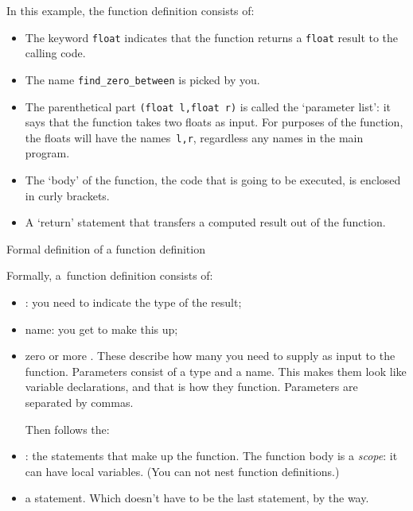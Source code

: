 In this example, the function definition consists of:
\begin{itemize}
\item The  keyword \lstinline{float} indicates that the function 
  returns a \lstinline{float} result to the calling code.
\item The name \lstinline{find_zero_between} is picked by you.
\item The parenthetical part \lstinline{(float l,float r)} is called the `parameter list':
  it says that the function takes two floats as input.
  For purposes of the function,
  the floats will have the names~\lstinline{l,r},
  regardless any names in the main program.
\item The `body' of the function, the code that is going to be
  executed, is enclosed in curly brackets.
\item A `return' statement that transfers a computed result out of the function.
\end{itemize}

 {Formal definition of a function definition}

Formally, a~function definition
consists of:

\begin{itemize}
\item {}: you need to indicate
  the type of the result;
\item name: you get to make this up;
\item zero or more . These describe
  how many  you need to supply as
  input to the function. Parameters consist of a type and a name. This
  makes them look like variable declarations, and that is how they
  function. Parameters are separated by commas.

  Then follows the:
\item {}: the statements that make up
  the function. The function body is a \emph{scope}: it can have local
  variables. (You can not nest function definitions.)
\item a  statement. Which doesn't have to be
  the last statement, by the way.
\end{itemize}

